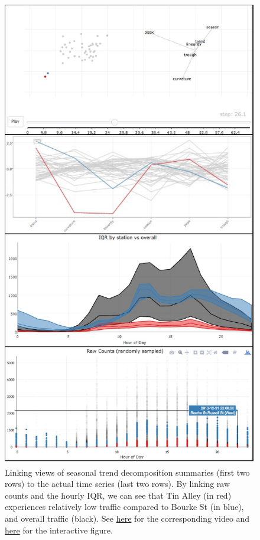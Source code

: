 \documentclass[12pt,]{article}
\theoremstyle{definition}
\theoremstyle{definition}
\theoremstyle{remark}
\begin{document}
\begin{figure}
\centering
\includegraphics{images/pedestrians-stl-tour.pdf}
\caption{\label{fig:pedestrians-stl-tour}Linking views of seasonal trend
decomposition summaries (first two rows) to the actual time series (last
two rows). By linking raw counts and the hourly IQR, we can see that Tin
Alley (in red) experiences relatively low traffic compared to Bourke St
(in blue), and overall traffic (black). See
\href{https://vimeo.com/192684799}{here} for the corresponding video and
\href{http://cpsievert.github.io/pedestrians/stl-tour/}{here} for the
interactive figure.}
\end{figure}
\end{document}
